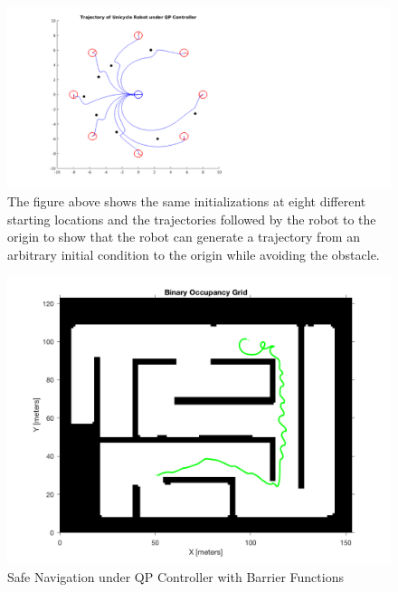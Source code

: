 \documentclass[conference]{IEEEtran}
\begin{document}
\begin{figure}[h!]
\centering
\includegraphics[scale=0.3]{octoPlotProofEditSqur.png} 
\caption{The figure above shows the same initializations at eight different starting locations and the trajectories followed by the robot to the origin to show that the robot can generate a trajectory from an arbitrary initial condition to the origin while avoiding the obstacle.\label{fig:octoplot}} 
\end{figure}

\begin{figure}[h!]
\centering
\includegraphics[scale=0.18]{thick_plot.png} 
\caption{Safe Navigation under QP Controller with Barrier Functions\label{fig:prm_works}}
\end{figure}
\end{document}
